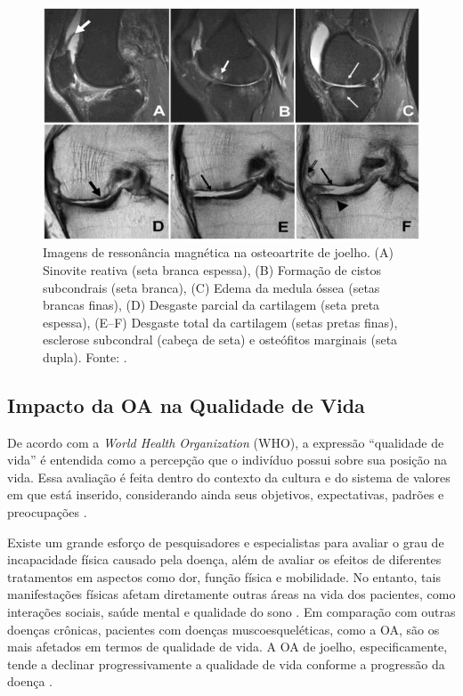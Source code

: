 \begin{figure}[!htbp]
    \centering
    \includegraphics[width=\linewidth]{figs/mud-patologicas-oa.jpg}
    \caption{Imagens de ressonância magnética na osteoartrite de joelho. (A) Sinovite reativa (seta branca espessa), (B) Formação de cistos subcondrais (seta branca), (C) Edema da medula óssea (setas brancas finas), (D) Desgaste parcial da cartilagem (seta preta espessa), (E–F) Desgaste total da cartilagem (setas pretas finas), esclerose subcondral (cabeça de seta) e osteófitos marginais (seta dupla). Fonte: .}
    \label{fig:osteoartrite-joelho}
\end{figure}

\subsection{Impacto da OA na Qualidade de Vida}

De acordo com a \textit{World Health Organization} (WHO), a expressão ``qualidade de vida'' é entendida como a percepção que o indivíduo possui sobre sua posição na vida. Essa avaliação é feita dentro do contexto da cultura e do sistema de valores em que está inserido, considerando ainda seus objetivos, expectativas, padrões e preocupações \cite{who2012}.

Existe um grande esforço de pesquisadores e especialistas para avaliar o grau de incapacidade física causado pela doença, além de avaliar os efeitos de diferentes tratamentos em aspectos como dor, função física e mobilidade. No entanto, tais manifestações físicas afetam diretamente outras áreas na vida dos pacientes, como interações sociais, saúde mental e qualidade do sono \cite{Ferrel1992}. Em comparação com outras doenças crônicas, pacientes com doenças muscoesqueléticas, como a OA, são os mais afetados em termos de qualidade de vida. A OA de joelho, especificamente, tende a declinar progressivamente a qualidade de vida conforme a progressão da doença \cite{Hoogeboom2013}.

